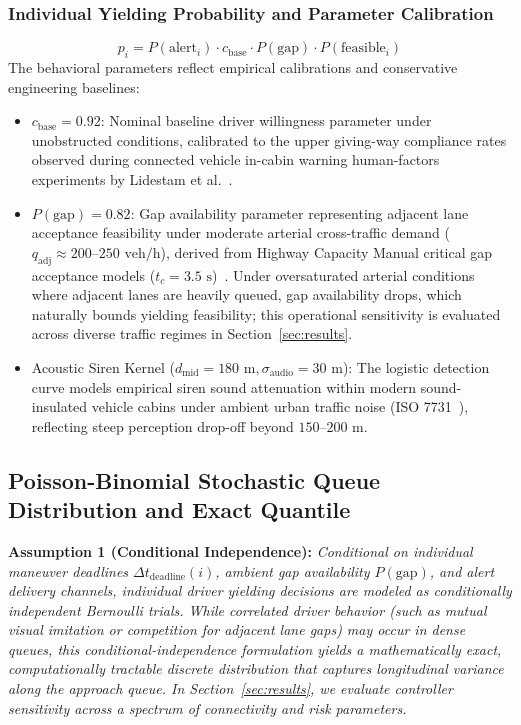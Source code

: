 \documentclass[journal,10pt,twocolumn]{IEEEtran}
\begin{document}
\subsubsection{Individual Yielding Probability and Parameter Calibration}
\begin{equation}
p_i = P(\text{alert}_i) \cdot c_{\text{base}} \cdot P(\text{gap}) \cdot P(\text{feasible}_i)
\end{equation}
The behavioral parameters reflect empirical calibrations and conservative engineering baselines:
\begin{itemize}
    \item $c_{\text{base}} = 0.92$: Nominal baseline driver willingness parameter under unobstructed conditions, calibrated to the upper giving-way compliance rates observed during connected vehicle in-cabin warning human-factors experiments by Lidestam et al.~\cite{lidestam2020}.
    \item $P(\text{gap}) = 0.82$: Gap availability parameter representing adjacent lane acceptance feasibility under moderate arterial cross-traffic demand ($q_{\text{adj}} \approx 200\text{--}250\text{ veh/h}$), derived from Highway Capacity Manual critical gap acceptance models ($t_c = 3.5\text{ s}$)~\cite{hcm2016}. Under oversaturated arterial conditions where adjacent lanes are heavily queued, gap availability drops, which naturally bounds yielding feasibility; this operational sensitivity is evaluated across diverse traffic regimes in Section~\ref{sec:results}.
    \item Acoustic Siren Kernel ($d_{\text{mid}} = 180\text{ m}, \sigma_{\text{audio}} = 30\text{ m}$): The logistic detection curve models empirical siren sound attenuation within modern sound-insulated vehicle cabins under ambient urban traffic noise (ISO 7731~\cite{iso7731}), reflecting steep perception drop-off beyond $150\text{--}200\text{ m}$.
\end{itemize}

\subsection{Poisson-Binomial Stochastic Queue Distribution and Exact Quantile}
\textbf{Assumption 1 (Conditional Independence):} \emph{Conditional on individual maneuver deadlines $\Delta t_{\text{deadline}}(i)$, ambient gap availability $P(\text{gap})$, and alert delivery channels, individual driver yielding decisions are modeled as conditionally independent Bernoulli trials. While correlated driver behavior (such as mutual visual imitation or competition for adjacent lane gaps) may occur in dense queues, this conditional-independence formulation yields a mathematically exact, computationally tractable discrete distribution that captures longitudinal variance along the approach queue. In Section~\ref{sec:results}, we evaluate controller sensitivity across a spectrum of connectivity and risk parameters.}
\end{document}

